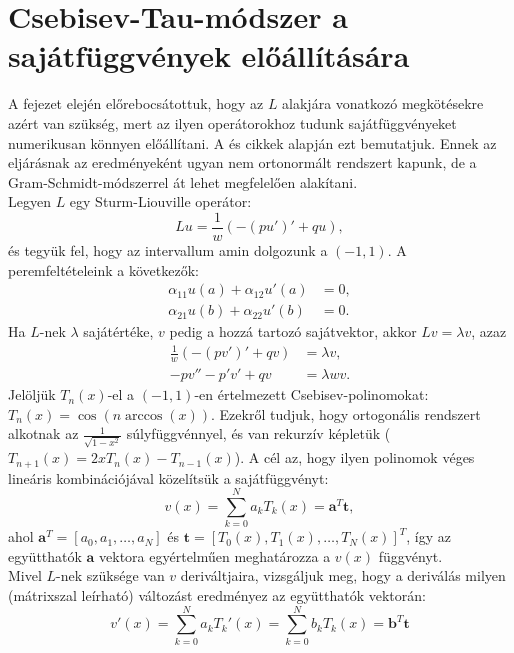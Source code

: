 \documentclass[oneside, titlepage, 12pt, a4paper]{report}
\begin{document}
\section{Csebisev-Tau-módszer a sajátfüggvények előállítására}
\label{sec:ChebTau}

A fejezet elején előrebocsátottuk, hogy az $L$ alakjára vonatkozó megkötésekre azért van szükség, mert az ilyen operátorokhoz tudunk sajátfüggvényeket numerikusan könnyen előállítani. A  \cite{ChebysevTau} és \cite{LISC} cikkek alapján ezt bemutatjuk. Ennek az eljárásnak az eredményeként ugyan nem ortonormált rendszert kapunk, de a Gram-Schmidt-módszerrel át lehet megfelelően alakítani. \\
Legyen $L$ egy Sturm-Liouville operátor:
\begin{equation*}
L u = \frac{1}{w} ( -(p u')' + q u),
\end{equation*}
és tegyük fel, hogy az intervallum amin dolgozunk a $(-1, 1)$. A peremfeltételeink a következők:
\begin{align*}
\alpha_{11}u(a) + \alpha_{12}u'(a) &= 0, \\
\alpha_{21}u(b) + \alpha_{22}u'(b) &= 0.
\end{align*}
Ha $L$-nek $\lambda$ sajátértéke, $v$ pedig a hozzá tartozó sajátvektor, akkor $L v = \lambda v$, azaz
\begin{align}
\frac{1}{w} ( -(p v')' + q v) &= \lambda v, \nonumber \\
-p v'' - p' v' + q v &= \lambda w v. \label{eq:CT:2}
\end{align}
Jelöljük $T_n(x)$-el a $(-1, 1)$-en értelmezett Csebisev-polinomokat: $T_n(x) = \cos(n \arccos(x))$. Ezekről tudjuk, hogy ortogonális rendszert alkotnak az $\frac{1}{\sqrt{1 - x^2}}$ súlyfüggvénnyel, és van rekurzív képletük ($T_{n+1}(x) = 2xT_n(x) - T_{n-1}(x)$). A cél az, hogy ilyen polinomok véges lineáris kombinációjával közelítsük a sajátfüggvényt:
\begin{equation*}
v(x) = \sum_{k = 0}^N a_k T_k(x) = \mathbf{a}^T \mathbf{t},
\end{equation*}
ahol $\mathbf{a}^T = [a_0, a_1, \dots, a_N]$ és $\mathbf{t} = [T_0(x), T_1(x), \dots, T_N(x)]^T$, így az együtthatók $\mathbf{a}$ vektora egyértelműen meghatározza a $v(x)$ függvényt. \\
Mivel $L$-nek szüksége van $v$ deriváltjaira, vizsgáljuk meg, hogy a deriválás milyen (mátrixszal leírható) változást eredményez az együtthatók vektorán:
\begin{equation}
v'(x) = \sum_{k = 0}^N a_k T_k'(x) = \sum_{k = 0}^N b_k T_k(x) = \mathbf{b}^T \mathbf{t} \label{eq:CT:1}
\end{equation}
\end{document}
